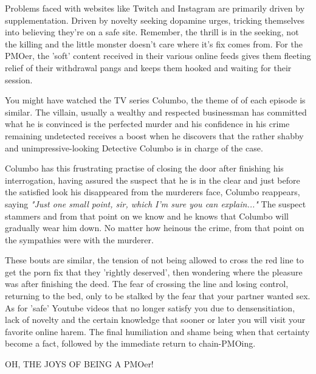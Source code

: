 \documentclass[easypeasy.tex]{subfiles}
\begin{document}
Problems faced with websites like Twitch and Instagram are primarily driven by supplementation. Driven by novelty seeking dopamine urges, tricking themselves into believing they're on a safe site. Remember, the thrill is in the seeking, not the killing and the little monster doesn't care where it's fix comes from. For the PMOer, the 'soft' content received in their various online feeds gives them fleeting relief of their withdrawal pangs and keeps them hooked and waiting for their session.

You might have watched the TV series Columbo, the theme of of each episode is similar. The villain, usually a wealthy and respected businessman has committed what he is convinced is the perfected murder and his confidence in his crime remaining undetected receives a boost when he discovers that the rather shabby and unimpressive-looking Detective Columbo is in charge of the case.

Columbo has this frustrating practise of closing the door after finishing his interrogation, having assured the suspect that he is in the clear and just before the satisfied look his disappeared from the murderers face, Columbo reappears, saying \textit{"Just one small point, sir, which I'm sure you can explain..."} The suspect stammers and from that point on we know and he knows that Columbo will gradually wear him down. No matter how heinous the crime, from that point on the sympathies were with the murderer.

These bouts are similar, the tension of not being allowed to cross the red line to get the porn fix that they 'rightly deserved', then wondering where the pleasure was after finishing the deed. The fear of crossing the line and losing control, returning to the bed, only to be stalked by the fear that your partner wanted sex. As for 'safe' Youtube videos that no longer satisfy you due to densensitiation, lack of novelty and the certain knowledge that sooner or later you will visit your favorite online harem. The final humiliation and shame being when that certainty become a fact, followed by the immediate return to chain-PMOing.

{\huge OH, THE JOYS OF BEING A PMOer!}
\end{document}
